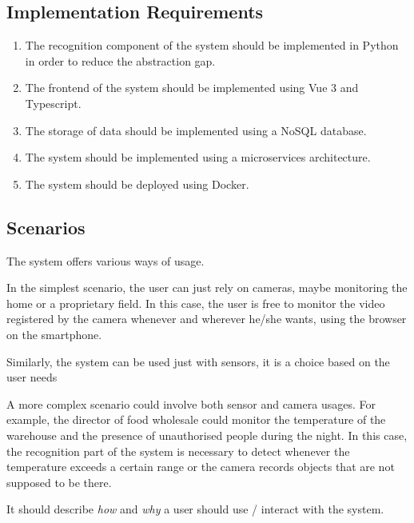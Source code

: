 \documentclass{scrartcl}
\begin{document}
    \subsection{Implementation Requirements}\label{subsec:implementation-requirements}
    \begin{enumerate}
        \item \label{itm:impl-1} The recognition component of the system should be implemented in Python in order to reduce the abstraction gap.
        \item \label{itm:impl-2} The frontend of the system should be implemented using Vue 3 and Typescript.
        \item \label{itm:impl-3} The storage of data should be implemented using a NoSQL database.
        \item \label{itm:impl-4} The system should be implemented using a microservices architecture.
        \item \label{itm:impl-5} The system should be deployed using Docker.
    \end{enumerate}

    \begin{enumerate}
    \end{enumerate}


    \subsection{Scenarios}
    The system offers various ways of usage.

    In the simplest scenario, the user can just rely on cameras, maybe monitoring
    the home or a proprietary field.
    In this case, the user is free to monitor the video registered by the camera whenever and wherever he/she wants,
    using the browser on the smartphone.

    Similarly, the system can be used just with sensors, it is a choice based on the user needs

    A more complex scenario could involve both sensor and camera usages.
    For example, the director of food wholesale could monitor the temperature of the warehouse and the presence of
    unauthorised people during the night.
    In this case, the recognition part of the system is necessary to detect whenever the
    temperature exceeds a certain range or the camera records objects that are not supposed to be there.

%
    It should describe \emph{how} and \emph{why} a user should use / interact with the system.
\end{document}
